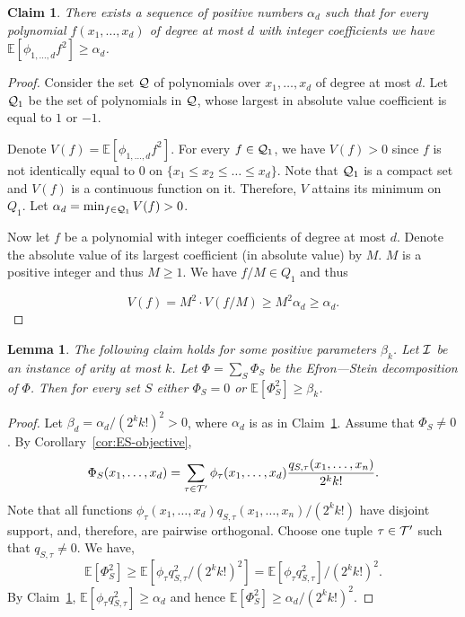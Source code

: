 \documentclass[11pt]{article}
\newif\ifconf
\newcommand {\Exp}       {\mathbb{E}}
\newcommand {\E}     [1] {\Exp\left[#1\right]}
\newcommand {\calQ}  {{\cal{Q}}}
\newcommand {\Tau}    {{\cal{T}}}
\newtheorem{lemma}[theorem]{Lemma}
\newtheorem{claim}[theorem]{Claim}
\begin{document}
\begin{claim}\label{claim:compact}
There exists a sequence of positive numbers $\alpha_d$ such that for every polynomial $f(x_1,\dots,x_d)$ of degree at most $d$ with integer coefficients we have $\E{\phi_{1,\dots,d} f^2} \geq \alpha_d$.
\end{claim}
\begin{proof}
Consider the set $\calQ$ of polynomials over $x_1, \dots, x_d$
of degree at most $d$. Let $\calQ_1$ be the set of polynomials in $\calQ$, whose largest
in absolute value coefficient is equal to $1$ or $-1$.

Denote $V(f) = \E{\phi_{1,\dots,d} f^2}$. For every $f \in \calQ_1$, we have $V(f) > 0$ since $f$ is not identically equal to $0$ on $\{x_1\leq x_2\leq \dots \leq x_d\}$.
Note that $\calQ_1$ is a compact set and $V(f)$ is a continuous function on it.
Therefore, $V$ attains its minimum on $Q_1$.
Let $\alpha_d = \min_{f \in \calQ_1} V(f) > 0$.

Now let $f$ be a polynomial with integer coefficients of degree at most $d$. Denote the absolute value of its largest
coefficient (in absolute value) by $M$. $M$ is a positive integer and thus $M \geq 1$. We have $f/M \in Q_1$ and thus
\ifconf
$V(f) = M^2 \cdot V(f/M) \geq M^2 \alpha_d \geq \alpha_d$.
\else
$$V(f) = M^2 \cdot V(f/M) \geq M^2 \alpha_d \geq \alpha_d.$$
\fi
\end{proof}
\begin{lemma}\label{lem:beta}
The following claim holds for some positive parameters $\beta_k$. Let $\cal I$ be an instance of arity at most $k$. Let $\Phi = \sum_{S} \Phi_S$ be the Efron---Stein decomposition of $\Phi$. Then for every set $S$ either $\Phi_S = 0$ or $\E{\Phi_S^2} \geq \beta_k$.
\end{lemma}
\begin{proof}
Let $\beta_d = \alpha_d / (2^{k} k!)^2 > 0$, where $\alpha_d$ is as in Claim~\ref{claim:compact}.
Assume that $\Phi_S \neq 0$. By Corollary~\ref{cor:ES-objective},
$$\Phi_S(x_1,\dots,x_d) = \sum_{\tau\in \Tau'}
\phi_{\tau}(x_1,\dots,x_d) \frac{q_{S,\tau}(x_1,\dots, x_n)}{2^{k} k!}.$$
Note that all functions
$\phi_{\tau}(x_1,\dots,x_d)   q_{S,\tau}(x_1,\dots, x_n)/ (2^{k} k!)$ have disjoint support, and, therefore, are pairwise orthogonal.
Choose one tuple $\tau \in \Tau'$ such that $q_{S,\tau}\neq 0$.
We have, $$\E{\Phi_S^2} \geq \E{\phi_{\tau} q_{S,\tau}^2 / (2^{k} k!)^2} = \E{\phi_{\tau} q_{S,\tau}^2} / (2^{k} k!)^2.$$
By Claim~\ref{claim:compact}, $\E{\phi_{\tau} q_{S,\tau}^2} \geq \alpha_d$ and hence
$\E{\Phi_S^2} \geq \alpha_d / (2^{k} k!)^2$.
\end{proof}
\end{document}
